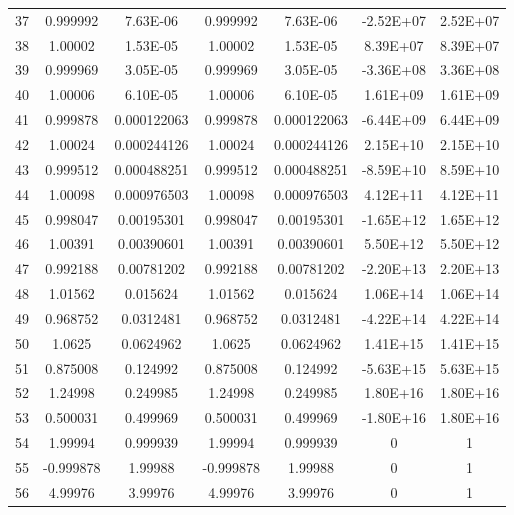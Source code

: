 \documentclass{article}
\begin{document}
\begin{table}[htbp]
\begin{tabular}{lcccccc}
		37        & 0.999992    & 7.63E-06      & 0.999992    & 7.63E-06      & -2.52E+07   & 2.52E+07      \\
		38        & 1.00002     & 1.53E-05      & 1.00002     & 1.53E-05      & 8.39E+07    & 8.39E+07      \\
		39        & 0.999969    & 3.05E-05      & 0.999969    & 3.05E-05      & -3.36E+08   & 3.36E+08      \\
		40        & 1.00006     & 6.10E-05      & 1.00006     & 6.10E-05      & 1.61E+09    & 1.61E+09      \\
		41        & 0.999878    & 0.000122063   & 0.999878    & 0.000122063   & -6.44E+09   & 6.44E+09      \\
		42        & 1.00024     & 0.000244126   & 1.00024     & 0.000244126   & 2.15E+10    & 2.15E+10      \\
		43        & 0.999512    & 0.000488251   & 0.999512    & 0.000488251   & -8.59E+10   & 8.59E+10      \\
		44        & 1.00098     & 0.000976503   & 1.00098     & 0.000976503   & 4.12E+11    & 4.12E+11      \\
		45        & 0.998047    & 0.00195301    & 0.998047    & 0.00195301    & -1.65E+12   & 1.65E+12      \\
		46        & 1.00391     & 0.00390601    & 1.00391     & 0.00390601    & 5.50E+12    & 5.50E+12      \\
		47        & 0.992188    & 0.00781202    & 0.992188    & 0.00781202    & -2.20E+13   & 2.20E+13      \\
		48        & 1.01562     & 0.015624      & 1.01562     & 0.015624      & 1.06E+14    & 1.06E+14      \\
		49        & 0.968752    & 0.0312481     & 0.968752    & 0.0312481     & -4.22E+14   & 4.22E+14      \\
		50        & 1.0625      & 0.0624962     & 1.0625      & 0.0624962     & 1.41E+15    & 1.41E+15      \\
		51        & 0.875008    & 0.124992      & 0.875008    & 0.124992      & -5.63E+15   & 5.63E+15      \\
		52        & 1.24998     & 0.249985      & 1.24998     & 0.249985      & 1.80E+16    & 1.80E+16      \\
		53        & 0.500031    & 0.499969      & 0.500031    & 0.499969      & -1.80E+16   & 1.80E+16      \\
		54        & 1.99994     & 0.999939      & 1.99994     & 0.999939      & 0           & 1             \\
		55        & -0.999878   & 1.99988       & -0.999878   & 1.99988       & 0           & 1             \\
		56        & 4.99976     & 3.99976       & 4.99976     & 3.99976       & 0           & 1             \\
		
		\bottomrule
	\end{tabular}
\end{table}
\end{document}
